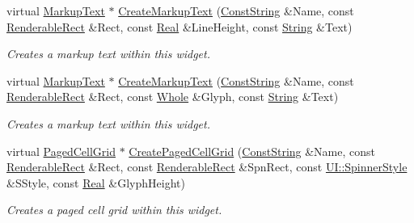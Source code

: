 \begin{DoxyCompactItemize}
virtual \hyperlink{classMezzanine_1_1UI_1_1MarkupText}{MarkupText} $\ast$ \hyperlink{classMezzanine_1_1UI_1_1RenderableContainerWidget_a42be1f21bd23eaca548243d94e25009b}{CreateMarkupText} (\hyperlink{namespaceMezzanine_a63cd699ac54b73953f35ec9cfc05e506}{ConstString} \&Name, const \hyperlink{structMezzanine_1_1UI_1_1RenderableRect}{RenderableRect} \&Rect, const \hyperlink{namespaceMezzanine_a726731b1a7df72bf3583e4a97282c6f6}{Real} \&LineHeight, const \hyperlink{namespaceMezzanine_acf9fcc130e6ebf08e3d8491aebcf1c86}{String} \&Text)
\begin{DoxyCompactList}\small\item\em Creates a markup text within this widget. \item\end{DoxyCompactList}\item 
virtual \hyperlink{classMezzanine_1_1UI_1_1MarkupText}{MarkupText} $\ast$ \hyperlink{classMezzanine_1_1UI_1_1RenderableContainerWidget_a7c70dd9a1404fd9ae3a95bc7e6613349}{CreateMarkupText} (\hyperlink{namespaceMezzanine_a63cd699ac54b73953f35ec9cfc05e506}{ConstString} \&Name, const \hyperlink{structMezzanine_1_1UI_1_1RenderableRect}{RenderableRect} \&Rect, const \hyperlink{namespaceMezzanine_adcbb6ce6d1eb4379d109e51171e2e493}{Whole} \&Glyph, const \hyperlink{namespaceMezzanine_acf9fcc130e6ebf08e3d8491aebcf1c86}{String} \&Text)
\begin{DoxyCompactList}\small\item\em Creates a markup text within this widget. \item\end{DoxyCompactList}\item 
virtual \hyperlink{classMezzanine_1_1UI_1_1PagedCellGrid}{PagedCellGrid} $\ast$ \hyperlink{classMezzanine_1_1UI_1_1RenderableContainerWidget_a304bcbffecb97c9f07ad3c21f112a9e9}{CreatePagedCellGrid} (\hyperlink{namespaceMezzanine_a63cd699ac54b73953f35ec9cfc05e506}{ConstString} \&Name, const \hyperlink{structMezzanine_1_1UI_1_1RenderableRect}{RenderableRect} \&Rect, const \hyperlink{structMezzanine_1_1UI_1_1RenderableRect}{RenderableRect} \&SpnRect, const \hyperlink{namespaceMezzanine_1_1UI_a62462d4df783dcdda77e1590a96bc6d6}{UI::SpinnerStyle} \&SStyle, const \hyperlink{namespaceMezzanine_a726731b1a7df72bf3583e4a97282c6f6}{Real} \&GlyphHeight)
\begin{DoxyCompactList}\small\item\em Creates a paged cell grid within this widget. \item\end{DoxyCompactList}\item 

\end{DoxyCompactItemize}
